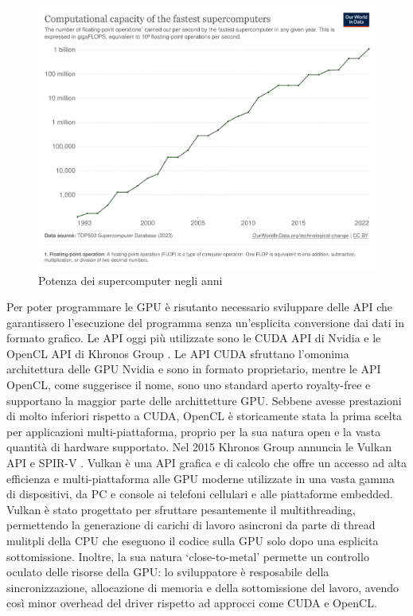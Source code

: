 \begin{figure}[h]
\centering
\includegraphics[width=.9\linewidth]{images/chapter1/supercomputer_flops.png}
\caption{Potenza dei supercomputer negli anni}
\label{fig:supercomputer_flops}
\end{figure}
    

Per poter programmare le GPU è risutanto necessario sviluppare delle \gls{API} che garantissero l'esecuzione del programma senza un'esplicita conversione dai dati in formato grafico. Le API oggi più utilizzate sono le \gls{CUDA} API di Nvidia \cite[]{Nvidia:CUDA} e le OpenCL API di Khronos Group \cite[]{KG:OpenCL}. Le API CUDA sfruttano l'omonima architettura delle GPU Nvidia e sono in formato proprietario, mentre le API OpenCL, come suggerisce il nome, sono uno standard aperto royalty-free e supportano la maggior parte delle archittetture GPU. Sebbene avesse prestazioni di molto inferiori rispetto a CUDA, OpenCL è storicamente stata la prima scelta per applicazioni multi-piattaforma, proprio per la sua natura open e la vasta quantità di hardware supportato. Nel 2015 Khronos Group annuncia le Vulkan API \cite[]{KG:Vulkan} e SPIR-V \cite[]{KG:SPIR-V}. Vulkan è una API grafica e di calcolo che offre un accesso ad alta efficienza e multi-piattaforma alle GPU moderne utilizzate in una vasta gamma di dispositivi, da PC e console ai telefoni cellulari e alle piattaforme embedded. Vulkan è stato progettato per sfruttare pesantemente il multithreading, permettendo la generazione di carichi di lavoro asincroni da parte di thread mulitpli della CPU che eseguono il codice sulla GPU solo dopo una esplicita sottomissione. Inoltre, la sua natura `close-to-metal' permette un controllo oculato delle risorse della GPU: lo sviluppatore è resposabile della sincronizzazione, allocazione di memoria e della sottomissione del lavoro, avendo così minor overhead del driver rispetto ad approcci come CUDA e OpenCL.

